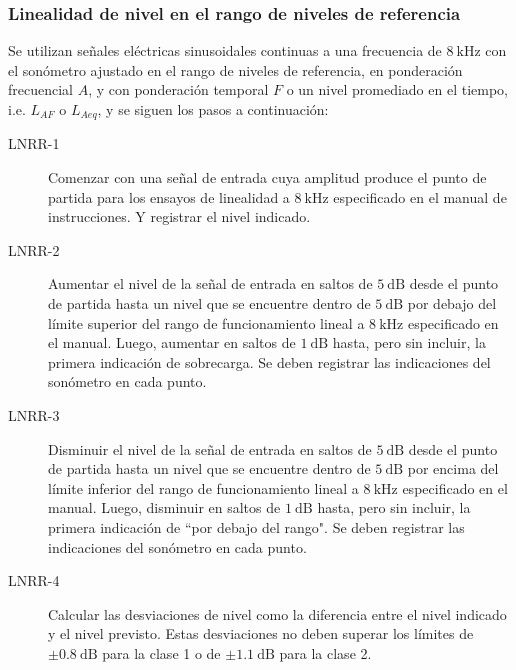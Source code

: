 \subsubsection{Linealidad de nivel en el rango de niveles de referencia}
Se utilizan señales eléctricas sinusoidales continuas a una frecuencia de $\qty{8}{\kHz}$ con el sonómetro ajustado en el rango de niveles de referencia, en ponderación frecuencial $A$, y con ponderación temporal $F$ o un nivel promediado en el tiempo, i.e. $L_{AF}$ o $L_{Aeq}$, y se siguen los pasos a continuación:
%
\begin{description}
    \item[LNRR-1] Comenzar con una señal de entrada cuya amplitud produce el punto de partida para los ensayos de linealidad a $\qty{8}{\kHz}$ especificado en el manual de instrucciones.
    Y registrar el nivel indicado.

    \item[LNRR-2] Aumentar el nivel de la señal de entrada en saltos de $\qty{5}{\dB}$ desde el punto de partida hasta un nivel que se encuentre dentro de $\qty{5}{\dB}$ por debajo del límite superior del rango de funcionamiento lineal a $\qty{8}{\kHz}$ especificado en el manual.
    Luego, aumentar en saltos de $\qty{1}{\dB}$ hasta, pero sin incluir, la primera indicación de sobrecarga.
    Se deben registrar las indicaciones del sonómetro en cada punto.

    \item[LNRR-3] Disminuir el nivel de la señal de entrada en saltos de $\qty{5}{\dB}$ desde el punto de partida hasta un nivel que se encuentre dentro de $\qty{5}{\dB}$ por encima del límite inferior del rango de funcionamiento lineal a $\qty{8}{\kHz}$ especificado en el manual.
    Luego, disminuir en saltos de $\qty{1}{\dB}$ hasta, pero sin incluir, la primera indicación de ``por debajo del rango".
    Se deben registrar las indicaciones del sonómetro en cada punto.

    \item[LNRR-4] Calcular las desviaciones de nivel como la diferencia entre el nivel indicado y el nivel previsto.
    Estas desviaciones no deben superar los límites de $\pm\qty{0.8}{\dB}$ para la clase 1 o de $\pm\qty{1.1}{\dB}$ para la clase 2.
\end{description}


